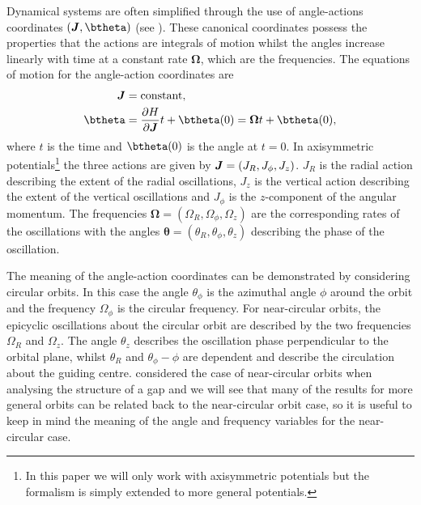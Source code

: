 \documentclass[useAMS,usenatbib,fleqn,a4paper]{mn2e}
\newcommand{\bs}[1]{\bmath{#1}}
\begin{document}
Dynamical systems are often simplified through the use of angle-actions coordinates $(\bs{J},\btheta)$ (see \citealt{BinneyTremaine}). These canonical coordinates possess the properties that the actions are integrals of motion whilst the angles increase linearly with time at a constant rate $\boldsymbol{\Omega}$, which are the frequencies. The equations of motion for the angle-action coordinates are
\begin{equation}
\begin{split}
\bs{J}&=\mathrm{constant},\\
\btheta&=\frac{\partial H}{\partial\boldsymbol{J}}t+\btheta(0)=\boldsymbol{\Omega}t+\btheta(0),
\end{split}
\end{equation}
where $t$ is the time and $\btheta(0)$ is the angle at $t=0$. In axisymmetric potentials\footnote{In this paper we will only work with axisymmetric potentials but the formalism is simply extended to more general potentials.} the three actions are given by $\bs{J}=(J_R,J_\phi,J_z)$. $J_R$ is the radial action describing the extent of the radial oscillations, $J_z$ is the vertical action describing the extent of the vertical oscillations and $J_\phi$ is the $z$-component of the angular momentum. The frequencies $\boldsymbol{\Omega}=(\Omega_R,\Omega_\phi,\Omega_z)$  are the corresponding rates of the oscillations with the angles $\boldsymbol{\theta}=(\theta_R,\theta_\phi,\theta_z)$ describing the phase of the oscillation.

The meaning of the angle-action coordinates can be demonstrated by considering circular orbits. In this case the angle $\theta_\phi$ is the azimuthal angle $\phi$ around the orbit and the frequency $\Omega_\phi$ is the circular frequency. For near-circular orbits, the epicyclic oscillations about the circular orbit are described by the two frequencies $\Omega_R$ and $\Omega_z$. The angle $\theta_z$ describes the oscillation phase perpendicular to the orbital plane, whilst $\theta_R$ and $\theta_\phi-\phi$ are dependent and describe the circulation about the guiding centre. \cite{ErkalBelokurov2015} considered the case of near-circular orbits when analysing the structure of a gap and we will see that many of the results for more general orbits can be related back to the near-circular orbit case, so it is useful to keep in mind the meaning of the angle and frequency variables for the near-circular case.
\end{document}
